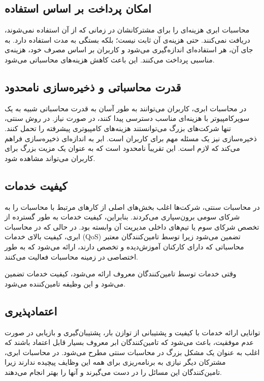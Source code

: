 \documentclass{book}
\begin{document}
    \subsection{امکان پرداخت بر اساس استفاده}

        محاسبات ابری هزینه‌ای را برای مشترکانشان در زمانی که از آن استفاده نمی‌شوند، دریافت نمی‌کنند. حتی هزینه‌ی آن ثابت نیست؛ بلکه بستگی به مدت استفاده دارد. به جای آن، هر استفاده‌ای اندازه‌گیری می‌شود و کاربران بر اساس مصرف خود، هزینه‌ی مناسبی پرداخت می‌کنند. این باعث کاهش هزینه‌های محاسباتی می‌شود.

    \subsection{قدرت محاسباتی و ذخیره‌سازی نامحدود}

        در محاسبات ابری، کاربران می‌توانند به طور آسان به قدرت محاسباتی شبیه به یک سوپرکامپیوتر با هزینه‌ای مناسب دسترسی پیدا کنند، در صورت نیاز. در روش سنتی، تنها شرکت‌های بزرگ می‌توانستند هزینه‌های کامپیوتری پیشرفته را تحمل کنند. ذخیره‌سازی نیز یک مسئله مهم برای کاربران است. ابر به اندازه‌ای ذخیره‌سازی فراهم می‌کند که لازم است. این تقریباً نامحدود است که به عنوان یک مزیت بزرگ برای کاربران می‌تواند مشاهده شود.

    \subsection{کیفیت خدمات}

        در محاسبات سنتی، شرکت‌ها اغلب بخش‌های اصلی از کارهای مرتبط با محاسبات را به شرکای سومی برون‌سپاری می‌کردند. بنابراین، کیفیت خدمات به طور گسترده از تخصص شرکای سوم یا تیم‌های داخلی مدیریت آن وابسته بود. در حالی که در محاسبات ابری، کیفیت بالای خدمات (QoS) تضمین می‌شود زیرا توسط تامین‌کنندگان معتبر محاسباتی که دارای کارکنان آموزش‌دیده و تخصص دارند، ارائه می‌شود که به طور اختصاصی در زمینه محاسبات فعالیت می‌کنند.
    
    \begin{addinfo}
        
        وقتی خدمات توسط تامین‌کنندگان معروف ارائه می‌شود، کیفیت خدمات تضمین می‌شود و این وظیفه تامین‌کننده می‌شود.

    \end{addinfo}

    \subsection{اعتماد‌پذیری}

        توانایی ارائه خدمات با کیفیت و پشتیبانی از توازن بار، پشتیبان‌گیری و بازیابی در صورت عدم موفقیت، باعث می‌شود که تامین‌کنندگان ابر معروف بسیار قابل اعتماد باشند که اغلب به عنوان یک مشکل بزرگ در محاسبات سنتی مطرح می‌شود. در محاسبات ابری، مشترکان دیگر نیازی به برنامه‌ریزی برای همه این وظایف پیچیده ندارند زیرا تامین‌کنندگان این مسائل را در دست می‌گیرند و آنها را بهتر انجام می‌دهند.
\end{document}
